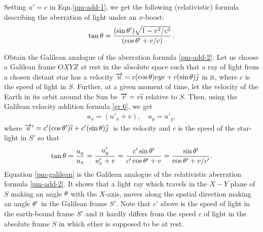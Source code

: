 Setting $u'=c$ in Eqn.\eqref{pm-add-1}, we get the following 
(relativistic) formula describing the aberration of light 
under an $x$-boost:
\begin{align}\label{pm-add-2}
\tan{\theta}= 
\frac{(\sin{\theta}')\sqrt{1-v^2/c^2}}{(\cos{\theta}'+v/c)}\,.
\end{align}

\exm Obtain the Galilean analogue of the aberration 
formula
\eqref{pm-add-2}.
\soln Let us choose a Galilean frame $OXYZ$ at rest in the 
absolute space such that a ray of light from a chosen 
distant star has a velocity $\overrightarrow{u} = c(\cos{\theta})eye 
+c(\sin{\theta}){\widehat{\jmath}}$ in it, where $c$ is the speed of light in 
$S$. Further, at a given moment of time, let the velocity of 
the Earth in its orbit around the Sun be $\overrightarrow{v}=v{\widehat{\imath}}$ 
relative to $S$. Then, using the Galilean velocity addition 
formula \eqref{gr.6}, we get
\begin{align}
u_x=(u'_x+v),\quad u_y=u'_y,
\end{align}
where $\pvec{u} = c'(\cos\gkq')\eye +c'(\sin\gkq)\jay\ $ is 
the velocity and $c$ is the speed of the star-light in $S'$ 
so that
\begin{align}\label{pm-galilean}
\tan{\theta}=\frac{u_y}{u_x}=\frac{u'_y}{u'_x+v}
=\frac{c'\sin{\theta}'}{c'\cos{\theta}'+v}
=\frac{\sin{\theta}'}{\cos{\theta}'+v/c'}.
\end{align}
Equation  \eqref{pm-galilean} is the Galilean analogue 
of 
the relativistic aberration formula  \eqref{pm-add-2}. 
It 
shows that a light ray which travels in the $X-Y$ plane 
of 
$S$ making an angle ${\theta}$ with the $X$-axis, moves 
along 
the spatial direction making an angle ${\theta}'$ in the 
Galilean frame $S'$. Note that $c'$ above is the speed 
of 
light in the earth-bound frame $S'$ and it hardly 
differs 
from the speed $c$  of light in the absolute frame $S$ 
in 
which ether is supposed to  be at rest. \ebx

